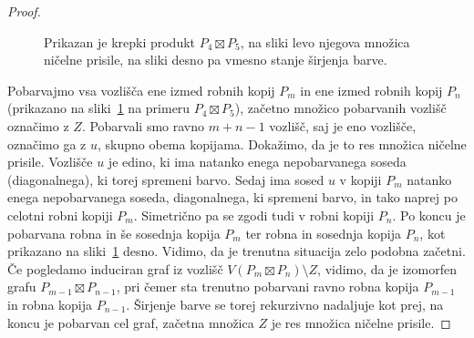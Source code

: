 \documentclass[12pt,a4paper,twoside]{article}
\theoremstyle{definition} %
\theoremstyle{plain} %
\numberwithin{equation}{section}  %
\begin{document}
\begin{proof}
\begin{figure}[h]
\begin{subfigure}{0.49\textwidth}
        \end{subfigure}
        \caption{Prikazan je krepki produkt $P_4 \boxtimes P_5$, na sliki levo njegova množica ničelne prisile, na sliki desno pa vmesno stanje širjenja barve.}
        \label{fig:zf-krepki-produkt-poti}
    \end{figure}
    
    Pobarvajmo vsa vozlišča ene izmed robnih kopij $P_m$ in ene izmed robnih kopij $P_n$ (prikazano na sliki~\ref{fig:zf-krepki-produkt-poti} na primeru $P_4 \boxtimes P_5$), začetno množico pobarvanih vozlišč označimo z $Z$. Pobarvali smo ravno $m + n - 1$ vozlišč, saj je eno vozlišče, označimo ga z $u$, skupno obema kopijama. Dokažimo, da je to res množica ničelne prisile. Vozlišče $u$ je edino, ki ima natanko enega nepobarvanega soseda (diagonalnega), ki torej spremeni barvo. Sedaj ima sosed $u$ v kopiji $P_m$ natanko enega nepobarvanega soseda, diagonalnega, ki spremeni barvo, in tako naprej po celotni robni kopiji $P_m$. Simetrično pa se zgodi tudi v robni kopiji $P_n$. Po koncu je pobarvana robna in še sosednja kopija $P_m$ ter robna in sosednja kopija $P_n$, kot prikazano na sliki~\ref{fig:zf-krepki-produkt-poti} desno. Vidimo, da je trenutna situacija zelo podobna začetni. Če pogledamo induciran graf iz vozlišč $V(P_m \boxtimes P_n) \setminus Z$, vidimo, da je izomorfen grafu $P_{m-1} \boxtimes P_{n-1}$, pri čemer sta trenutno pobarvani ravno robna kopija $P_{m-1}$ in robna kopija $P_{n-1}$. Širjenje barve se torej rekurzivno nadaljuje kot prej, na koncu je pobarvan cel graf, začetna množica $Z$ je res množica ničelne prisile. 
\end{proof}
\end{document}
